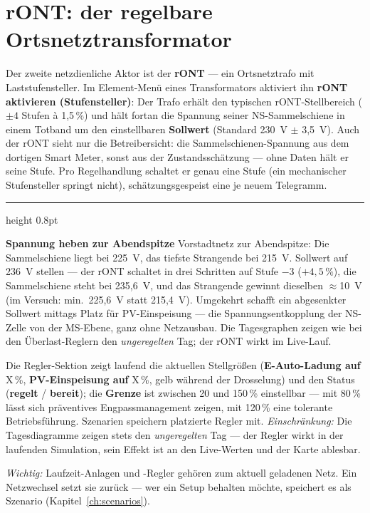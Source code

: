 \documentclass[11pt,a4paper,parskip=half]{scrreprt}
\newcommand{\ui}[1]{\textsf{\bfseries #1}}          %
\newenvironment{beispiel}[1][Beispiel]
  {\par\medskip
   {\color{bsp}\hrule height 0.8pt}\nopagebreak\smallskip
   \noindent\textbf{\textsf{\textcolor{bsp}{#1}}}\quad\ignorespaces}
  {\par\nopagebreak\smallskip{\color{bsp}\hrule height 0.8pt}\par\medskip}
\begin{document}
\section{rONT: der regelbare Ortsnetztransformator}

Der zweite netzdienliche Aktor ist der \textbf{rONT} --- ein
Ortsnetztrafo mit Laststufensteller. Im Element-Menü eines
Transformators aktiviert ihn \ui{rONT aktivieren (Stufensteller)}:
Der Trafo erhält den typischen rONT-Stellbereich ($\pm 4$ Stufen à
1,5\,\%) und hält fortan die Spannung seiner NS-Sammelschiene in
einem Totband um den einstellbaren \ui{Sollwert} (Standard 230~V
$\pm$ 3,5~V). Auch der rONT sieht nur die Betreibersicht: die
Sammelschienen-Spannung aus dem dortigen Smart Meter, sonst aus der
Zustandsschätzung --- ohne Daten hält er seine Stufe. Pro
Regelhandlung schaltet er genau eine Stufe (ein mechanischer
Stufensteller springt nicht), schätzungsgespeist eine je neuem
Telegramm.

\begin{beispiel}[Spannung heben zur Abendspitze]
Vorstadtnetz zur Abendspitze: Die Sammelschiene liegt bei 225~V, das
tiefste Strangende bei 215~V. Sollwert auf 236~V stellen --- der rONT
schaltet in drei Schritten auf Stufe $-3$ ($+4{,}5\,\%$), die
Sammelschiene steht bei 235,6~V, und das Strangende gewinnt dieselben
$\approx$10~V (im Versuch: min.\ 225,6~V statt 215,4~V). Umgekehrt
schafft ein abgesenkter Sollwert mittags Platz für PV-Einspeisung ---
die Spannungsentkopplung der NS-Zelle von der MS-Ebene, ganz ohne
Netzausbau. Die Tagesgraphen zeigen wie bei den Überlast-Reglern den
\emph{ungeregelten} Tag; der rONT wirkt im Live-Lauf.
\end{beispiel}

Die Regler-Sektion zeigt laufend die aktuellen Stellgrößen
(\ui{E-Auto-Ladung auf} X\,\%, \ui{PV-Einspeisung auf} X\,\%, gelb
während der Drosselung) und den Status (\ui{regelt} /
\ui{bereit}); die \ui{Grenze} ist zwischen 20 und 150\,\%
einstellbar --- mit 80\,\% lässt sich präventives Engpassmanagement
zeigen, mit 120\,\% eine tolerante Betriebsführung. Szenarien
speichern platzierte Regler mit. \emph{Einschränkung:} Die
Tagesdiagramme zeigen stets den \emph{ungeregelten} Tag --- der
Regler wirkt in der laufenden Simulation, sein Effekt ist an den
Live-Werten und der Karte ablesbar.

\emph{Wichtig:} Laufzeit-Anlagen und -Regler gehören zum aktuell
geladenen Netz. Ein Netzwechsel setzt sie zurück --- wer ein Setup
behalten möchte, speichert es als Szenario
(Kapitel~\ref{ch:scenarios}).
\end{document}

